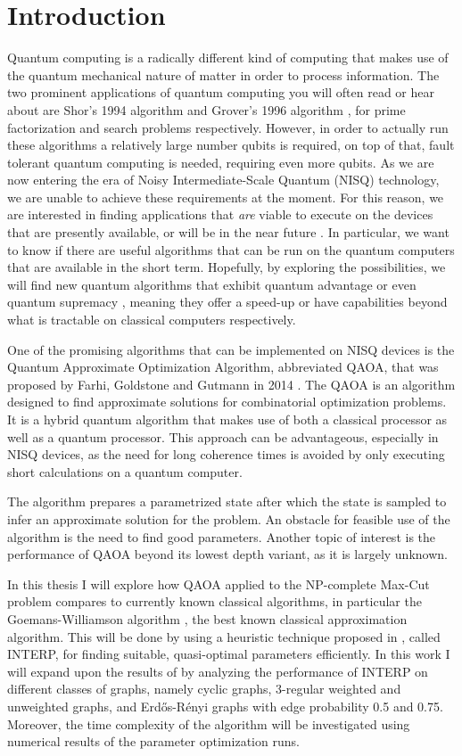 \chapter{Introduction}
Quantum computing is a radically different kind of computing that makes use of the quantum mechanical nature of matter in order to process information. The two prominent applications of quantum computing you will often read or hear about are Shor's 1994 algorithm \cite{Shor94} and Grover's 1996 algorithm \cite{Grover96}, for prime factorization and search problems respectively. However, in order to actually run these algorithms a relatively large number qubits is required, on top of that, fault tolerant quantum computing is needed, requiring even more qubits. As we are now entering the era of Noisy Intermediate-Scale Quantum (NISQ) technology, we are unable to achieve these requirements at the moment. For this reason, we are interested in finding applications that \emph{are} viable to execute on the devices that are presently available, or will be in the near future \cite{Preskill18}. In particular, we want to know if there are useful algorithms that can be run on the quantum computers that are available in the short term. Hopefully, by exploring the possibilities, we will find new quantum algorithms that exhibit quantum advantage or even quantum supremacy \cite{QuantumSupremacy}, meaning they offer a speed-up or have capabilities beyond what is tractable on classical computers respectively. 

One of the promising algorithms that can be implemented on NISQ devices is the Quantum Approximate Optimization Algorithm, abbreviated QAOA, that was proposed by Farhi, Goldstone and Gutmann in 2014 \cite{FGG14}. The QAOA is an algorithm designed to find approximate solutions for combinatorial optimization problems. It is a hybrid quantum algorithm that makes use of both a classical processor as well as a quantum processor. This approach can be advantageous, especially in NISQ devices, as the need for long coherence times is avoided by only executing short calculations on a quantum computer. 

The algorithm prepares a parametrized state after which the state is sampled to infer an approximate solution for the problem. An obstacle for feasible use of the algorithm is the need to find good parameters. Another topic of interest is the performance of QAOA beyond its lowest depth variant, as it is largely unknown.

In this thesis I will explore how QAOA applied to the NP-complete Max-Cut problem compares to currently known classical algorithms, in particular the Goemans-Williamson algorithm \cite{GW95}, the best known classical approximation algorithm. This will be done by using a heuristic technique proposed in \cite{ZWCPL18}, called INTERP, for finding suitable, quasi-optimal parameters efficiently. In this work I will expand upon the results of \cite{ZWCPL18} by analyzing the performance of INTERP on different classes of graphs, namely cyclic graphs, 3-regular weighted and unweighted graphs, and Erd\H{o}s-R\'enyi graphs with edge probability 0.5 and 0.75. Moreover, the time complexity of the algorithm will be investigated using numerical results of the parameter optimization runs.

